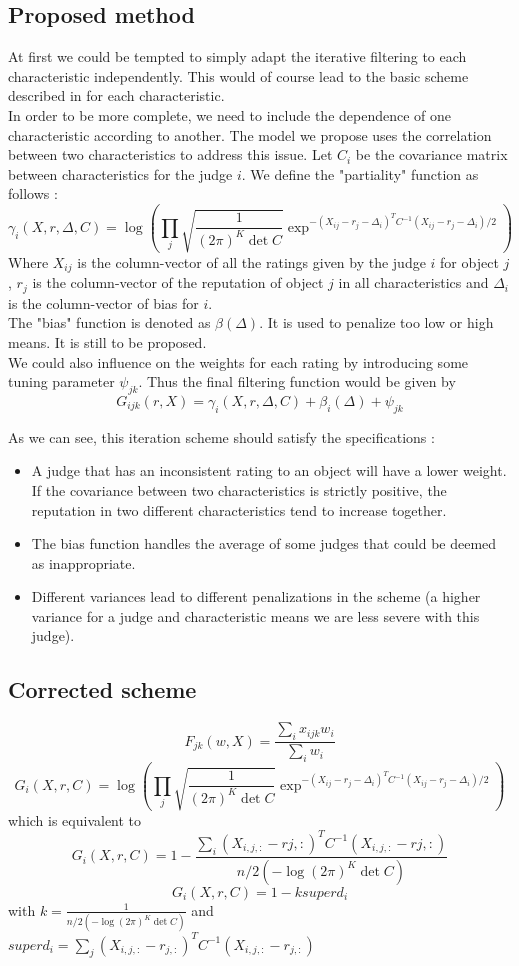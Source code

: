 \subsection*{Proposed method}
At first we could be tempted to simply adapt the iterative filtering to each characteristic independently. This would of course lead to the basic scheme described in \cite{Cristo1} for each characteristic.\\
In order to be more complete, we need to include the dependence of one characteristic according to another.
The model we propose uses the correlation between two characteristics to address this issue.
Let $C_i$ be the covariance matrix between characteristics for the judge $i$.
We define the "partiality" function as follows :
$$\gamma_{i}(X,r,\Delta,C) = \log (\prod_j \sqrt{\frac{1}{(2\pi)^{K}\det C}} \exp^{- (X_{ij}-r_j-\Delta_i)^TC^{-1} (X_{ij}-r_j-\Delta_i)/2})$$
Where $X_{ij}$ is the column-vector of all the ratings given by the judge $i$ for object $j$, $r_j$ is the column-vector of the reputation of object $j$ in all characteristics and $\Delta_i$ is the column-vector of bias for $i$.\\
The "bias" function is denoted as $\beta(\Delta)$. It is used to penalize too low or high means. It is still to be proposed.\\
We could also influence on the weights for each rating by introducing some tuning parameter $\psi_{jk}$.
Thus the final filtering function would be given by 
$$G_{ijk}(r,X) = \gamma_{i}(X,r,\Delta,C) + \beta_i(\Delta)+\psi_{jk}$$

As we can see, this iteration scheme should satisfy the specifications : 
\begin{itemize}
\item A judge that has an inconsistent rating to an object will have a lower weight. If the covariance between two characteristics is strictly positive, the reputation in two different characteristics tend to increase together.
\item The bias function handles the average of some judges that could be deemed as inappropriate.
\item Different variances lead to different penalizations in the scheme (a higher variance for a judge and characteristic means we are less severe with this judge).
\end{itemize}

\subsection*{Corrected scheme}
$$F_{jk}(w,X) = \frac{\sum_{i}x_{ijk}w_{i}}{\sum_i w_{i}}$$
$$G_{i}(X,r,C) = \log (\prod_j \sqrt{\frac{1}{(2\pi)^{K}\det C}} \exp^{- (X_{ij}-r_j-\Delta_i)^TC^{-1} (X_{ij}-r_j-\Delta_i)/2})$$
which is equivalent to
$$G_{i}(X,r,C) = 1 - \frac{\sum_i (X_{i,j,:}-r{j,:})^TC^{-1}(X_{i,j,:}-r{j,:})}{n/2(-\log(2\pi )^K \det C)}$$
$$G_{i}(X,r,C) = 1 -k superd_i$$
with $k= \frac{1}{n/2(-\log(2\pi )^K \det C)}$ and $superd_i =  \sum_{j} (X_{i,j,:}-r_{j,:})^T C^{-1} (X_{i,j,:}-r_{j,:})$


